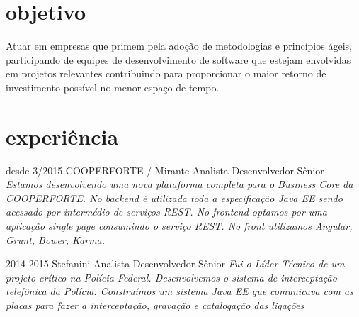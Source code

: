 \section{objetivo}

Atuar em empresas que primem pela adoção de metodologias e princípios ágeis, participando de equipes de desenvolvimento de software que estejam envolvidas em projetos relevantes contribuindo para proporcionar o maior retorno de investimento possível no menor espaço de tempo. 

\section{experiência}

\begin{entrylist}

  \entry
    {desde 3/2015}
    {COOPERFORTE / Mirante}
    {Analista Desenvolvedor Sênior}
    {\emph{Estamos desenvolvendo uma nova plataforma completa para o Business Core da COOPERFORTE.
    No backend é utilizada toda a especificação Java EE sendo acessado por intermédio de serviços REST.
    No frontend optamos por uma aplicação single page consumindo o serviço REST. No front utilizamos Angular, Grunt, Bower, Karma.}}

  \entry
    {2014-2015}
    {Stefanini}
    {Analista Desenvolvedor Sênior}
    {\emph{Fui o Líder Técnico de um projeto crítico na Polícia Federal. Desenvolvemos o sistema de interceptação telefônica da Polícia.
    Construímos um sistema Java EE que comunicava com as placas para fazer a interceptação, gravação e catalogação das ligações}}


\end{entrylist}
